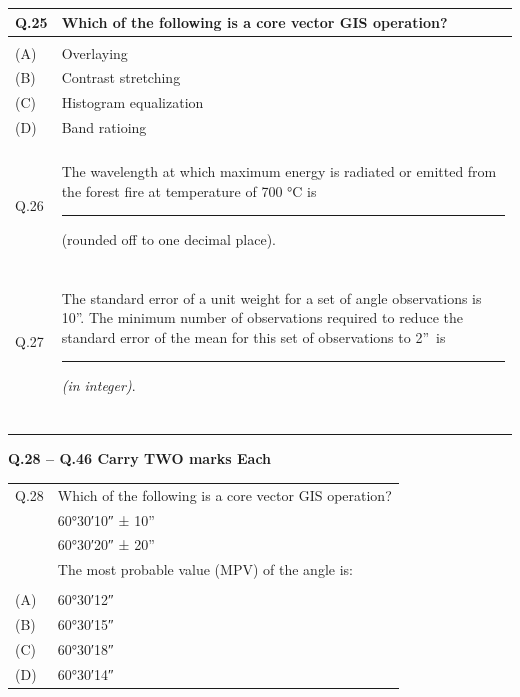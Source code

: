 \documentclass[12pt]{article}
\begin{document}
\begin{table}[H]
\renewcommand{\arraystretch}{3}
\setlength{\tabcolsep}{8pt}
\begin{tabular}{|l|p{15cm}|}
\hline

Q.25 &Which of the following is a core vector GIS operation?\\ \hline 
& \\ \hline
(A)&Overlaying\\ \hline
(B)&Contrast stretching\\ \hline
(C)&Histogram equalization\\ \hline
(D)&Band ratioing \\ \hline
 & \\ \hline

Q.26 & The wavelength at which maximum energy is radiated or emitted from the forest
fire at temperature of 700 °C is \rule{2cm}{0.15mm} (rounded off to one decimal place). \\ \hline
& \\ \hline

Q.27 & The standard error of a unit weight for a set of angle observations is 10\textquotedblright.
The minimum number of observations required to reduce the standard error of the
mean for this set of observations to 2\textquotedblright\ is  \rule{2cm}{0.15mm} \textit{(in integer)}.\\ \hline

 & \\ 
 & \\
 & \\\hline
 & \\ \hline
 

 

\end{tabular}
\end{table}


\begin{small}\textbf{Q.28 – Q.46 Carry TWO marks Each}\end{small}


\begin{table}[H]
\renewcommand{\arraystretch}{3}
\setlength{\tabcolsep}{8pt}
\begin{tabular}{|l|p{15cm}|}
\hline

Q.28 &Which of the following is a core vector GIS operation?\\
    & \ang{60;30;10} ± 10''\\  
    & \ang{60;30;20} ± 20''\\
    &The most probable value (MPV) of the angle is: \\ \hline
    & \\\hline
(A)&\ang{60;30;12}\\ \hline
(B)&\ang{60;30;15}\\ \hline
(C)&\ang{60;30;18}\\ \hline
(D)&\ang{60;30;14}\\ \hline

\end{tabular}
\end{table} 
\newpage
\end{document}
